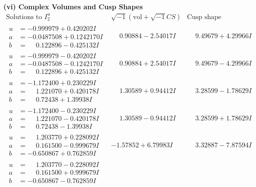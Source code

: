 \documentclass[1p]{elsarticle_modified}
\theoremstyle{definition}
\newcommand{\I}{\sqrt{-1}}
\begin{document}
\newpage\flushleft \textbf{(vi) Complex Volumes and Cusp Shapes}
$$\begin{array}{c|c|c}  
\text{Solutions to }I^u_{2}& \I (\text{vol} + \sqrt{-1}CS) & \text{Cusp shape}\\
 \hline 
\begin{aligned}
u &= -0.999979 + 0.420202 I \\
a &= -0.0487508 + 0.1242170 I \\
b &= \phantom{-}0.122896 - 0.425132 I\end{aligned}
 & \phantom{-}0.90884 - 2.54017 I & \phantom{-}9.49679 + 4.29966 I \\ \hline\begin{aligned}
u &= -0.999979 - 0.420202 I \\
a &= -0.0487508 - 0.1242170 I \\
b &= \phantom{-}0.122896 + 0.425132 I\end{aligned}
 & \phantom{-}0.90884 + 2.54017 I & \phantom{-}9.49679 - 4.29966 I \\ \hline\begin{aligned}
u &= -1.172400 + 0.230229 I \\
a &= \phantom{-}1.221070 + 0.420178 I \\
b &= \phantom{-}0.72438 + 1.39938 I\end{aligned}
 & \phantom{-}1.30589 + 0.94412 I & \phantom{-}3.28599 - 1.78629 I \\ \hline\begin{aligned}
u &= -1.172400 - 0.230229 I \\
a &= \phantom{-}1.221070 - 0.420178 I \\
b &= \phantom{-}0.72438 - 1.39938 I\end{aligned}
 & \phantom{-}1.30589 - 0.94412 I & \phantom{-}3.28599 + 1.78629 I \\ \hline\begin{aligned}
u &= \phantom{-}1.203770 + 0.228092 I \\
a &= \phantom{-}0.161500 - 0.999679 I \\
b &= -0.650867 + 0.762859 I\end{aligned}
 & -1.57852 + 6.79983 I & \phantom{-}3.32887 - 7.87594 I \\ \hline\begin{aligned}
u &= \phantom{-}1.203770 - 0.228092 I \\
a &= \phantom{-}0.161500 + 0.999679 I \\
b &= -0.650867 - 0.762859 I\end{aligned}

\end{array}$$
\end{document}
